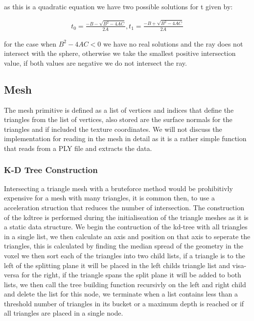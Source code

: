as this is a quadratic equation we have two possible solutions for t given by:

\begin{align*}
t_0 = \frac{- B - \sqrt{B^2 - 4AC}}{2A}
,
t_1 = \frac{- B + \sqrt{B^2 - 4AC}}{2A}
\end{align*}

for the case when $B^2 - 4AC < 0$ we have no real solutions and the ray does not intersect with the sphere, otherwise we
take the smallest positive intersection value, if both values are negative we do not intersect the ray.

\subsection{Mesh}
The mesh primitive is defined as a list of vertices and indices that define the triangles from the list of vertices, also
stored are the surface normals for the triangles and if included the texture coordinates. We will not discuss the implementation
for reading in the mesh in detail as it is a rather simple function that reads from a PLY file and extracts the data.


\subsubsection{K-D Tree Construction}
\label{sec:obj_mesh}
Intersecting a triangle mesh with a bruteforce method would be prohibitivly expensive for a mesh with many triangles, it
is common then, to use a acceleration struction that reduces the number of intersection. The
construction of the kdtree is performed during the initialiseation of the triangle meshes as it is a static data structure.
We begin the contruction of the kd-tree with all
triangles in a single list, we then calculate an axis and position on that axis to seperate the triangles, this is calculated
by finding the median spread of the geometry in the voxel we then sort each of the triangles into two child lists, if a triangle is
to the left of the splitting plane it will be placed in the left childs triangle list and visa-versa for the right, if the
triangle spans the split plane it will be added to both lists, we then call the tree building function recursivly on the
left and right child and delete the list for this node, we terminate when a list contains less than a threshold number
of triangles in its bucket or a maximum depth is reached or if all triangles are placed in a single node.

